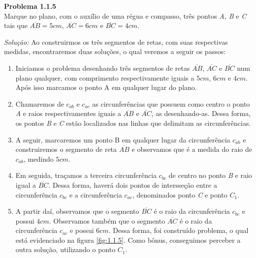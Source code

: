 \documentclass[a4paper, 11pt]{book}
\newenvironment{problem}[2][Problema] 
    { \begin{mdframed}[backgroundcolor=gray!20] \textbf{#1 #2} \\}
    {  \end{mdframed}}
\newenvironment{solution}
    {\textit{Solução:}}
    {}
\begin{document}
\begin{problem}{1.1.5}
    \label{prob:1.1.5}
Marque no plano, com o auxílio de uma régua e compasso, três pontos \textit{A, B} e \textit{C} tais que $\overline{AB} = 5cm$, $\overline{AC} = 6cm$ e $\overline{BC} = 4cm$.   
\end{problem}
\begin{solution}
    Ao construirmos os três segmentos de retas, com suas respectivas medidas, encontraremos duas soluções, o qual veremos a seguir os passos:
    \begin{enumerate}[\textbf{\arabic*}:]
        \item Iniciamos o problema desenhando três segmentos de retas $\overline{AB}$, $\overline{AC}$ e $\overline{BC}$ num plano qualquer, com comprimento respectivamente iguais a $5cm$,  $6cm$ e  $4cm$. Após isso marcamos o ponto A em qualquer lugar do plano.
        \item Chamaremos de $c_{ab}$ e  $c_{ac}$ as circunferências que possuem como centro o ponto  \textit{A} e raios respectivamentes iguais a $\overline{AB}$ e $\overline{AC}$, as desenhando-as. Dessa forma, os pontos \textit{B} e \textit{C} estão localizados nas linhas que delimitam as circunferências.
        \item A seguir, marcaremos um ponto B em qualquer lugar da circunferência $c_{ab}$ e construiremos o segmento de reta $\overline{AB}$ e observamos que é a medida do raio de $c_{ab}$, medindo $5cm$.
        \item Em seguida, traçamos a terceira circunferência $c_{bc}$ de centro no ponto \textit{B} e raio igual a $\overline{BC}$. Dessa forma, haverá dois pontos de intersseção entre a circunferência $c_{bc}$ e a circunferência $c_{ac}$, denominados ponto  \textit{C} e ponto $C_{1}$.
        \item A partir daí, observamos que o segmento $\overline{BC}$ é o raio da circunferência $c_{bc}$ e possui  $4cm$. Observamos também que o segmento  $\overline{AC}$ é o raio da circunferência $c_{ac}$ e possui  $6cm$. Dessa forma, foi construído problema, o qual está evidenciado na figura \ref{fig:1.1.5}. Como bônus, conseguimos perceber a outra solução, utilizando o ponto $C_{1}$.
    \end{enumerate}
 

\end{solution}
\end{document}
